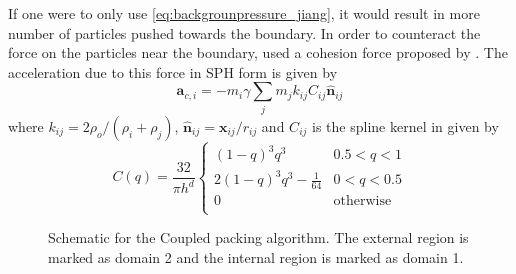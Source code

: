 \documentclass[preprint,12pt]{elsarticle}
\newcommand{\ten}[1]{\ensuremath{\mathbf{#1}}}
\begin{document}
If one were to only use \cref{eq:backgrounpressure_jiang}, it would result in
more number of particles pushed towards the boundary. In order to counteract
the force on the particles near the boundary, \citet{jiang2015blue} used a
cohesion force proposed by \citet{akinci2013versatile}. The acceleration due
to this force in SPH form
is given by
\begin{equation}
 \ten{a}_{c, i} = -m_{i} \gamma  \sum_j m_{j} k_{ij} C_{ij} \hat{\ten{n}}_{ij}
  \label{eq:coh}
\end{equation}
where $k_{ij} = 2 \rho_{o}/(\rho_{i} + \rho_{j})$, $\hat{\ten{n}}_{ij} =
\ten{x}_{ij}/r_{ij}$ and $C_{ij}$ is the spline kernel in
\cite{akinci2013versatile} given by
\begin{equation}
  C(q) = \frac{32}{\pi h^{d}} \left \{
  \begin{array}{ll}
    (1-q)^{3}q^{3} & 0.5 < q < 1\\
    2(1-q)^{3}q^{3} - \frac{1}{64}& 0 < q < 0.5\\
    0 & \text{otherwise}\\
  \end{array} \right .
  \label{eq:cs:akinci}
\end{equation}

\begin{figure}[ht!]
  \centering
  \caption{Schematic for the Coupled packing algorithm. The external region is
    marked as domain 2 and the internal region is marked as domain 1.}
  \label{fig:coupled}
\end{figure}
\end{document}

